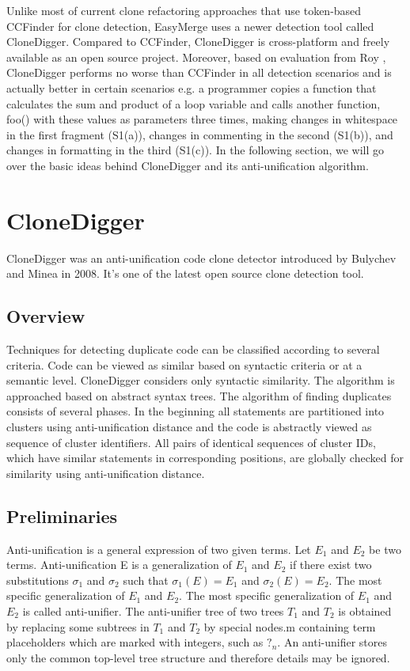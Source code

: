 \documentclass{acm_proc_article-sp}
\begin{document}
Unlike most of current clone refactoring approaches that use token-based CCFinder \cite{kamiya} for clone detection, EasyMerge uses a newer detection tool called CloneDigger.
Compared to CCFinder, CloneDigger is cross-platform and freely available as an open source project. Moreover, based on evaluation from Roy \cite{roy2},
CloneDigger performs no worse than CCFinder in all detection scenarios and is actually better in certain scenarios e.g. a programmer copies a function that calculates the sum
and product of a loop variable and calls another function, foo() with these values as parameters three times, making changes in whitespace in the first fragment (S1(a)), changes
in commenting in the second (S1(b)), and changes in formatting in the third (S1(c)). In the following section, we will go over the basic ideas behind CloneDigger and its anti-unification
algorithm.

\section{CloneDigger}
CloneDigger \cite{bulychev} was an anti-unification code clone detector introduced by Bulychev and Minea in 2008. It's one of the latest open source clone detection tool.

\subsection{Overview}
Techniques for detecting duplicate code can be classified according to several criteria. Code can be viewed as similar based on syntactic criteria or at a semantic level. CloneDigger considers only syntactic similarity. The algorithm is approached based on abstract syntax trees. The algorithm of finding duplicates consists of several phases. In the beginning all statements are partitioned into clusters using anti-unification distance and the code is abstractly viewed as sequence of cluster identifiers. All pairs of identical sequences of cluster IDs, which have similar statements in corresponding positions, are globally checked for similarity using anti-unification distance.


\subsection{Preliminaries}
Anti-unification is a general expression of two given terms. Let $E_{1}$ and $E_{2}$ be two terms. Anti-unification E is a generalization of $E_{1}$ and $E_{2}$ if there exist two substitutions $\sigma_{1}$ and $\sigma_{2}$ such that $\sigma_{1}(E)=E_{1}$ and $\sigma_{2}(E)=E_{2}$. The most specific generalization of $E_{1}$ and $E_{2}$. The most specific generalization of $E_{1}$ and $E_{2}$ is called anti-unifier. The anti-unifier tree of two trees $T_{1}$ and $T_{2}$ is obtained by replacing some subtrees in $T_{1}$ and $T_{2}$ by special nodes.m containing term placeholders which are marked with integers, such as $?_{n}$. An anti-unifier stores only the common top-level tree structure and therefore details may be ignored.
\end{document}
